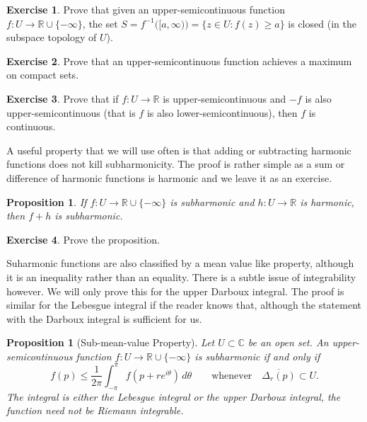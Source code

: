 \documentclass[12pt,openany]{book}
\newcommand{\C}{{\mathbb{C}}}
\newcommand{\R}{{\mathbb{R}}}
\theoremstyle{plain}
\newtheorem{prop}[thm]{Proposition}
\theoremstyle{remark}
\theoremstyle{definition}
\newenvironment{exbox}{%
    \def\FrameCommand{\vrule width 1pt \relax\hspace {10pt}}%
    \MakeFramed {\advance \hsize -\width \FrameRestore }%
}{%
    \endMakeFramed
}
\theoremstyle{exercise}
\newtheorem{exercise}{Exercise}[section]
\theoremstyle{example}
\begin{document}
\begin{exbox}
\begin{exercise}
Prove that given an upper-semicontinuous function $f \colon U \to \R \cup
\{-\infty\}$,
the set $S = f^{-1}\bigl([a,\infty)\bigr) = \{ z \in U : f(z) \geq a \}$
is closed (in the subspace topology of $U$).
\end{exercise}

\begin{exercise}
Prove that an upper-semicontinuous function achieves a maximum on compact sets.
\end{exercise}

\begin{exercise}
Prove that if $f \colon U \to \R$ is upper-semicontinuous and $-f$ is also
upper-semicontinuous (that is $f$ is also lower-semicontinuous), then $f$
is continuous.
\end{exercise}
\end{exbox}

A useful property that we will use often is that adding or subtracting 
harmonic functions does not kill subharmonicity.  The proof is rather simple
as a sum or difference of harmonic functions is harmonic and we leave it as
an exercise.

\begin{prop} \label{prop:fplushsubharmonic}
If $f \colon U \to \R \cup \{ - \infty \}$ is subharmonic and $h \colon U
\to \R$ is harmonic, then $f+h$ is subharmonic.
\end{prop}

\begin{exbox}
\begin{exercise}
Prove the proposition.
\end{exercise}
\end{exbox}

Suharmonic functions are also classified by a mean value like property,
although it is an inequality rather than an equality.  There is a subtle
issue of integrability however.
We will only prove this for the upper Darboux integral.
The proof is 
similar for the Lebesgue integral if the reader knows that, although
the statement with the Darboux integral is sufficient for us.

\begin{prop}[Sub-mean-value Property]
\label{prop:submeanprop}
Let $U \subset \C$ be an open set.
An upper-semicontinuous function $f \colon U \to \R \cup \{ -\infty \}$
is subharmonic if and only if
\begin{equation*}
f(p) \leq \frac{1}{2\pi} \int_{-\pi}^{\pi} f(p+re^{i\theta})\, d\theta
\qquad \text{whenever} \quad
\overline{\Delta_r(p)} \subset U .
\end{equation*}
The integral is either the Lebesgue integral or the upper Darboux integral,
the function need not be Riemann integrable.
\end{prop}
\end{document}
